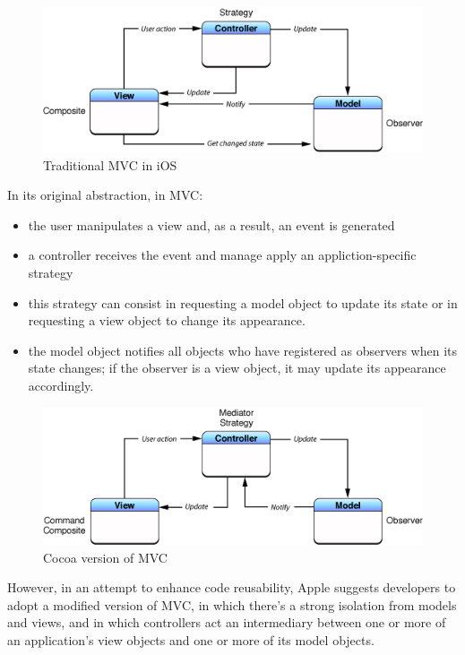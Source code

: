 \begin{figure}[htbp]
\centering
\includegraphics[scale=0.75]{imgs/ios_traditional_mvc.png}
\caption{Traditional MVC in iOS}
\end{figure}

In its original abstraction, in MVC:

\begin{itemize}
\itemsep1pt\parskip0pt
\item
  the user manipulates a view and, as a result, an event is generated
\item
  a controller receives the event and manage apply an
  appliction-specific strategy
\item
  this strategy can consist in requesting a model object to update its
  state or in requesting a view object to change its appearance.
\item
  the model object notifies all objects who have registered as observers
  when its state changes; if the observer is a view object, it may
  update its appearance accordingly.
\end{itemize}

\begin{figure}[htbp]
\centering
\includegraphics[scale=0.75]{imgs/cocoa_mvc.png}
\caption{Cocoa version of MVC}
\end{figure}

However, in an attempt to enhance code reusability, Apple suggests
developers to adopt a modified version of MVC, in which there's a strong
isolation from models and views, and in which controllers act an
intermediary between one or more of an application's view objects and
one or more of its model objects.

